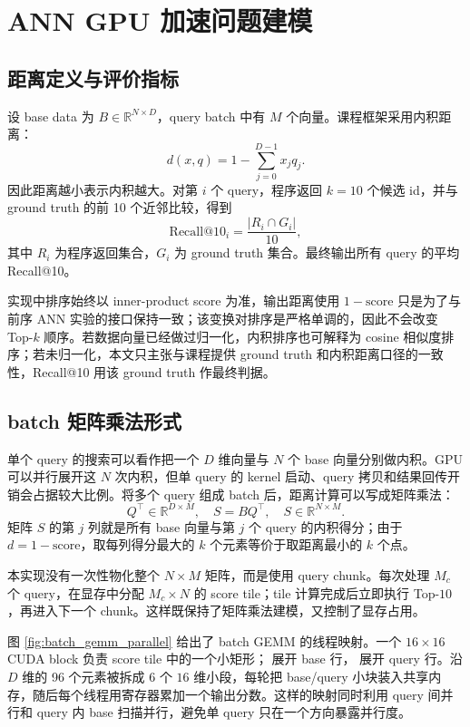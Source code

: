 \documentclass[a4paper,11pt,UTF8]{ctexart}
\newcommand{\code}[1]{\texttt{\detokenize{#1}}}
\begin{document}
\section{ANN GPU 加速问题建模}

\subsection{距离定义与评价指标}

设 base data 为 $B\in\mathbb{R}^{N\times D}$，query batch 中有 $M$ 个向量。课程框架采用内积距离：
\[
d(x,q)=1-\sum_{j=0}^{D-1}x_jq_j.
\]
因此距离越小表示内积越大。对第 $i$ 个 query，程序返回 $k=10$ 个候选 id，并与 ground truth 的前 10 个近邻比较，得到
\[
\mathrm{Recall@10}_i=\frac{|R_i\cap G_i|}{10},
\]
其中 $R_i$ 为程序返回集合，$G_i$ 为 ground truth 集合。最终输出所有 query 的平均 Recall@10。

实现中排序始终以 inner-product score 为准，输出距离使用 $1-\mathrm{score}$ 只是为了与前序 ANN 实验的接口保持一致；该变换对排序是严格单调的，因此不会改变 Top-$k$ 顺序。若数据向量已经做过归一化，内积排序也可解释为 cosine 相似度排序；若未归一化，本文只主张与课程提供 ground truth 和内积距离口径的一致性，Recall@10 用该 ground truth 作最终判据。

\subsection{batch 矩阵乘法形式}

单个 query 的搜索可以看作把一个 $D$ 维向量与 $N$ 个 base 向量分别做内积。GPU 可以并行展开这 $N$ 次内积，但单 query 的 kernel 启动、query 拷贝和结果回传开销会占据较大比例。将多个 query 组成 batch 后，距离计算可以写成矩阵乘法：
\[
Q^\top\in\mathbb{R}^{D\times M},\quad S=BQ^\top,\quad S\in\mathbb{R}^{N\times M}.
\]
矩阵 $S$ 的第 $j$ 列就是所有 base 向量与第 $j$ 个 query 的内积得分；由于 $d=1-\mathrm{score}$，取每列得分最大的 $k$ 个元素等价于取距离最小的 $k$ 个点。

本实现没有一次性物化整个 $N\times M$ 矩阵，而是使用 query chunk。每次处理 $M_c$ 个 query，在显存中分配 $M_c\times N$ 的 score tile；tile 计算完成后立即执行 Top-$10$，再进入下一个 chunk。这样既保持了矩阵乘法建模，又控制了显存占用。

图 \ref{fig:batch_gemm_parallel} 给出了 batch GEMM 的线程映射。一个 $16\times16$ CUDA block 负责 score tile 中的一个小矩形；\code{threadIdx.x} 展开 base 行，\code{threadIdx.y} 展开 query 行。沿 $D$ 维的 96 个元素被拆成 6 个 $16$ 维小段，每轮把 base/query 小块装入共享内存，随后每个线程用寄存器累加一个输出分数。这样的映射同时利用 query 间并行和 query 内 base 扫描并行，避免单 query 只在一个方向暴露并行度。
\end{document}
